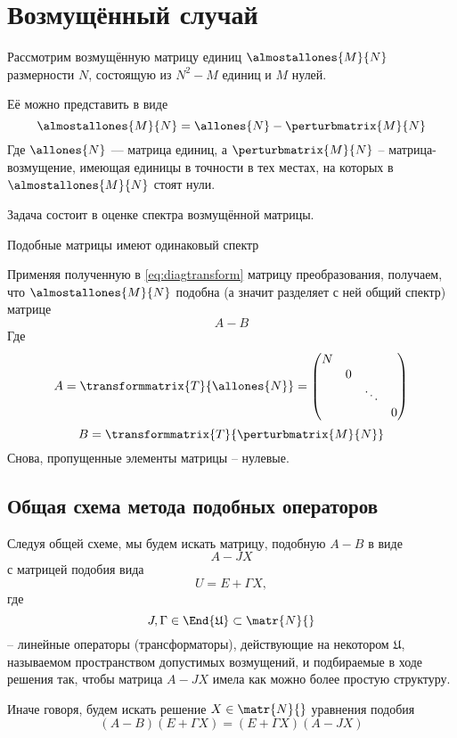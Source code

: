 \section{Возмущённый случай}

Рассмотрим возмущённую матрицу единиц
\( \almostallones{M}{N} \) размерности \( N \),
состоящую из \( N^2 - M \) единиц и \( M \) нулей.

Её можно представить в виде
\[
    \almostallones{M}{N} = \allones{N} - \perturbmatrix{M}{N}
    \]
Где \( \allones{N} \) --- матрица единиц,
а \( \perturbmatrix{M}{N} \) -- матрица-возмущение,
имеющая единицы в точности в тех местах,
на которых в \( \almostallones{M}{N} \) стоят нули.

Задача состоит в оценке спектра возмущённой матрицы.

\begin{lemma}
    Подобные матрицы имеют одинаковый спектр
\end{lemma}

Применяя полученную в \eqref{eq:diagtransform} матрицу преобразования,
получаем, что \( \almostallones{M}{N} \) подобна (а значит разделяет с ней общий спектр)
матрице
\[ A - B \]
Где
\[
    A = \transformmatrix{T}{\allones{N}}
    = \begin{pmatrix}
      N &   &        & \\
        & 0 &        & \\
        &   & \ddots & \\
        &   &        & 0
        \end{pmatrix}
        \]
\[
    B = \transformmatrix{T}{\perturbmatrix{M}{N}}
    \]
Снова, пропущенные элементы матрицы -- нулевые.

\subsection{Общая схема метода подобных операторов}
Следуя общей схеме, мы будем искать матрицу, подобную \( A - B \)
в виде
\[ A - J X \]
с матрицей подобия вида
\[ U = E + \Gamma X ,\]
где \[ J, \Gamma \in \End{\mathfrak U} \subset \matr{N}{} \]
-- линейные операторы (трансформаторы),
действующие на некотором \( \mathfrak U \),
называемом пространством допустимых возмущений,
и подбираемые в ходе решения так, чтобы матрица \( A - JX \)
имела как можно более простую структуру.

Иначе говоря, будем искать решение \( X \in\matr{N}{} \)
уравнения подобия
\begin{equation}\label{eq:similarity-orig}
    (A - B)(E+\Gamma X) = (E+\Gamma X) (A - JX)
\end{equation}

